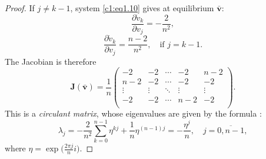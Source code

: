 \documentclass[12pt]{report}
\theoremstyle{definition}
\theoremstyle{remark}
\begin{document}
\begin{proof}
If $j\neq k-1$, system \eqref{c1:eq1.10} gives at equilibrium
$\bar{\mathbf{v}}$:
\[
  \frac{\partial\dot{v}_{k}}{\partial v_{j}}=-\frac{2}{n^{2}},
\]
\[
  \frac{\partial\dot{v}_{k}}{\partial v_{j}}
  =\frac{n-2}{n^{2}},\quad\text{if }j=k-1.
\]
The Jacobian is therefore
\[
  \mathbf{J}(\bar{\mathbf{v}})=\frac{1}{n}
  \begin{pmatrix}
    -2 & -2 & \cdots & -2 & n-2\\
    n-2 & -2 & \cdots & -2 & -2\\
    \vdots & \vdots & \ddots & \vdots & \vdots\\
    -2 & -2 & \cdots & n-2 & -2\\
  \end{pmatrix}.
\]
This is a \emph{circulant matrix}, whose eigenvalues are given by
the formula \cite{c1:Bellman1960}:
\begin{equation}
  \lambda_{j}
  =-\frac{2}{n^{2}}\sum_{k=0}^{n-1}\eta^{kj}
  +\frac{1}{n}\eta^{(n-1)j}
  =-\frac{\eta^{j}}{n},\quad j=\overline{0,n-1},
  \label{c1:eq1.11}
\end{equation}
where $\eta=\exp\!\biggl(\frac{2\pi j}{n}i\biggr)$. 

\end{proof}
\end{document}
